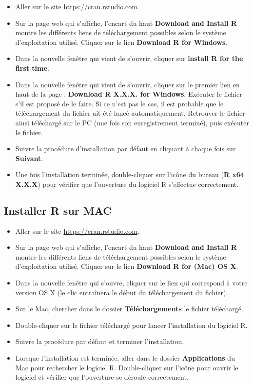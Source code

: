 \documentclass[
  french,
]{book}
\providecommand{\tightlist}{%
  \setlength{\itemsep}{0pt}\setlength{\parskip}{0pt}}
\begin{document}
\begin{itemize}
\tightlist
\item
  Aller sur le site \url{https://cran.rstudio.com}.
\item
  Sur la page web qui s'affiche, l'encart du haut \textbf{Download and Install R} montre les différents liens de téléchargement possibles selon le système d'exploitation utilisé. Cliquer sur le lien \textbf{Download R for Windows}.
\item
  Dans la nouvelle fenêtre qui vient de s'ouvrir, cliquer sur \textbf{install R for the first time}.
\item
  Dans la nouvelle fenêtre qui vient de s'ouvrir, cliquer sur le premier lien en haut de la page : \textbf{Download R X.X.X. for Windows}. Exécuter le fichier s'il est proposé de le faire. Si ce n'est pas le cas, il est probable que le téléchargement du fichier ait été lancé automatiquement. Retrouver le fichier ainsi téléchargé sur le PC (une fois son enregistrement terminé), puis exécuter le fichier.
\item
  Suivre la procédure d'installation par défaut en cliquant à chaque fois sur \textbf{Suivant}.
\item
  Une fois l'installation terminée, double-cliquer sur l'icône du bureau (\textbf{R x64 X.X.X}) pour vérifier que l'ouverture du logiciel R s'effectue correctement.
\end{itemize}

\hypertarget{installer-r-sur-mac}{%
\subsection{Installer R sur MAC}\label{installer-r-sur-mac}}

\begin{itemize}
\tightlist
\item
  Aller sur le site \url{https://cran.rstudio.com}.
\item
  Sur la page web qui s'affiche, l'encart du haut \textbf{Download and Install R} montre les différents liens de téléchargement possibles selon le système d'exploitation utilisé. Cliquer sur le lien \textbf{Download R for (Mac) OS X}.
\item
  Dans la nouvelle fenêtre qui s'ouvre, cliquer sur le lien qui correspond à votre version OS X (le clic entraînera le début du téléchargement du fichier).
\item
  Sur le Mac, chercher dans le dossier \textbf{Téléchargements} le fichier téléchargé.
\item
  Double-cliquer sur le fichier téléchargé pour lancer l'installation du logiciel R.
\item
  Suivre la procédure par défaut et terminer l'installation.
\item
  Lorsque l'installation est terminée, aller dans le dossier \textbf{Applications} du Mac pour rechercher le logiciel R. Double-cliquer sur l'icône pour ouvrir le logiciel et vérifier que l'ouverture se déroule correctement.
\end{itemize}
\end{document}
